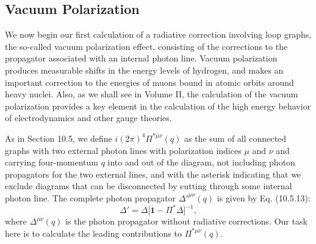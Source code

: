 
\subsection{Vacuum Polarization}

We now begin our first calculation of a radiative correction involving
loop graphs, the so-called vacuum polarization effect, consisting of the
corrections to the propagator associated with an internal photon line.
Vacuum polarization produces measurable shifts in the energy levels of
hydrogen, and makes an important correction to the energies of muons
bound in atomic orbits around heavy nuclei. Also, as we shall see in
Volume II, the calculation of the vacuum polarization provides a key
element in the calculation of the high energy behavior of electrodynamics
and other gauge theories.

\clearpage


As in Section 10.5, we define $i(2\pi)^4\Pi^{*\mu\nu}(q)$ as the sum of all
connected graphs with two external photon lines with polarization indices
$\mu$ and $\nu$ and carrying four-momentum $q$ into and out of the diagram,
not including photon propagators for the two external lines, and with the
asterisk indicating that we exclude diagrams that can be disconnected by
cutting through some internal photon line. The complete photon propagator
$\Delta'^{\mu\nu}(q)$ is given by Eq. (10.5.13):
\begin{equation}
  \Delta'=\Delta\bigl[\mathbf{1}-\Pi^*\Delta\bigr]^{-1},
  \tag{11.2.1}\label{eq:11.2.1}
\end{equation}
where $\Delta^{\mu\nu}(q)$ is the photon propagator without radiative
corrections. Our task here is to calculate the leading contributions to
$\Pi^{*\mu\nu}(q)$.

